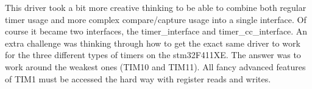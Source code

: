This driver took a bit more creative thinking to be able to combine both regular timer usage and more complex compare/capture usage into a single interface. Of course it became two interfaces, the timer\+\_\+interface and timer\+\_\+cc\+\_\+interface. An extra challenge was thinking through how to get the exact same driver to work for the three different types of timers on the stm32\+F411\+XE. The answer was to work around the weakest ones (T\+I\+M10 and T\+I\+M11). All fancy advanced features of T\+I\+M1 must be accessed the hard way with register reads and writes. 